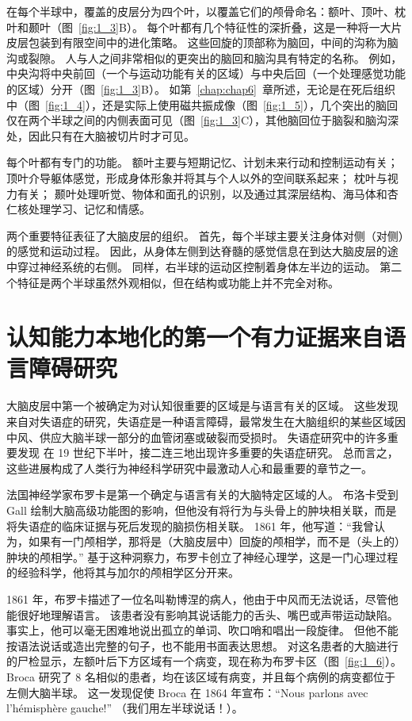 在每个半球中，覆盖的皮层分为四个叶，以覆盖它们的颅骨命名：额叶、顶叶、枕叶和颞叶（图~\ref{fig:1_3}B）。
每个叶都有几个特征性的深折叠，这是一种将一大片皮层包装到有限空间中的进化策略。
这些回旋的顶部称为脑回，中间的沟称为脑沟或裂隙。 
人与人之间非常相似的更突出的脑回和脑沟具有特定的名称。
例如，中央沟将中央前回（一个与运动功能有关的区域）与中央后回（一个处理感觉功能的区域）分开（图~\ref{fig:1_3}B）。
如第~\ref{chap:chap6}~章所述，无论是在死后组织中（图~\ref{fig:1_4}），还是实际上使用磁共振成像（图~\ref{fig:1_5}），几个突出的脑回仅在两个半球之间的内侧表面可见（图~\ref{fig:1_3}C），其他脑回位于脑裂和脑沟深处，因此只有在大脑被切片时才可见。


每个叶都有专门的功能。
额叶主要与短期记忆、计划未来行动和控制运动有关；
顶叶介导躯体感觉，形成身体形象并将其与个人以外的空间联系起来；
枕叶与视力有关；
颞叶处理听觉、物体和面孔的识别，以及通过其深层结构、海马体和杏仁核处理学习、记忆和情感。


两个重要特征表征了大脑皮层的组织。
首先，每个半球主要关注身体对侧（对侧）的感觉和运动过程。
因此，从身体左侧到达脊髓的感觉信息在到达大脑皮层的途中穿过神经系统的右侧。
同样，右半球的运动区控制着身体左半边的运动。
第二个特征是两个半球虽然外观相似，但在结构或功能上并不完全对称。



\section{认知能力本地化的第一个有力证据来自语言障碍研究}

大脑皮层中第一个被确定为对认知很重要的区域是与语言有关的区域。
这些发现来自对失语症的研究，失语症是一种语言障碍，最常发生在大脑组织的某些区域因中风、供应大脑半球一部分的血管闭塞或破裂而受损时。
失语症研究中的许多重要发现
在 19 世纪下半叶，接二连三地出现许多重要的失语症研究。
总而言之，这些进展构成了人类行为神经科学研究中最激动人心和最重要的章节之一。


法国神经学家布罗卡是第一个确定与语言有关的大脑特定区域的人。
布洛卡受到 Gall 绘制大脑高级功能图的影响，但他没有将行为与头骨上的肿块相关联，而是将失语症的临床证据与死后发现的脑损伤相关联。
1861 年，他写道：“我曾认为，如果有一门颅相学，那将是（大脑皮层中）回旋的颅相学，而不是（头上的）肿块的颅相学。” 
基于这种洞察力，布罗卡创立了神经心理学，这是一门心理过程的经验科学，他将其与加尔的颅相学区分开来。


1861 年，布罗卡描述了一位名叫勒博涅的病人，他由于中风而无法说话，尽管他能很好地理解语言。
该患者没有影响其说话能力的舌头、嘴巴或声带运动缺陷。
事实上，他可以毫无困难地说出孤立的单词、吹口哨和唱出一段旋律。
但他不能按语法说话或造出完整的句子，也不能用书面表达思想。
对这名患者的大脑进行的尸检显示，左额叶后下方区域有一个病变，现在称为布罗卡区（图~\ref{fig:1_6}）。
Broca 研究了 8 名相似的患者，均在该区域有病变，并且每个病例的病变都位于左侧大脑半球。
这一发现促使 Broca 在 1864 年宣布：“Nous parlons avec l’hémisphère gauche!” （我们用左半球说话！）。


